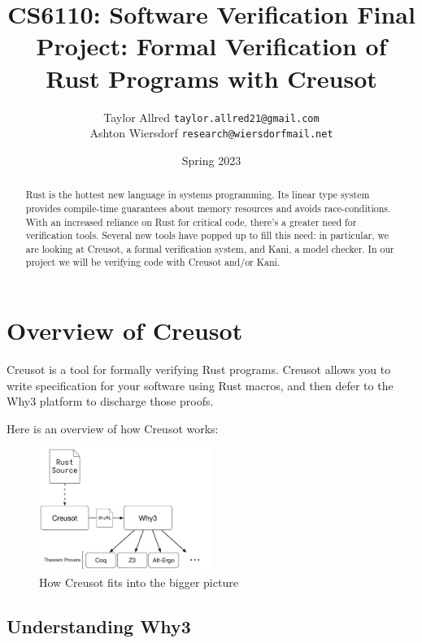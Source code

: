 \documentclass[12pt]{article}
\title{CS6110: Software Verification Final Project: Formal Verification of Rust Programs with Creusot}
\author{Taylor Allred \texttt{taylor.allred21@gmail.com}\\ Ashton Wiersdorf \texttt{research@wiersdorfmail.net}}
\date{Spring 2023}
\begin{document}
\maketitle

\begin{abstract}
\noindent
Rust is the hottest new language in systems programming.
Its linear type system provides compile-time guarantees about memory resources and avoids race-conditions.
With an increased reliance on Rust for critical code, there's a greater need for verification tools.
Several new tools have popped up to fill this need: in particular, we are looking at Creusot, a formal verification system, and Kani, a model checker.
In our project we will be verifying code with Creusot and/or Kani.
\end{abstract}

\setcounter{tocdepth}{2}
\tableofcontents

\section{Overview of Creusot}

Creusot\cite{denisCreusot2023} is a tool for formally verifying Rust programs.
Creusot allows you to write specification for your software using Rust macros, and then defer to the Why3\cite{bobotWhy3ShepherdYour} platform to discharge those proofs.

Here is an overview of how Creusot works:

\begin{figure}[h]
  \centering
\includegraphics[width=0.5\textwidth]{creusot_why3_diagram}
\caption{How Creusot fits into the bigger picture}
\end{figure}

\subsection{Understanding Why3}

\end{document}
